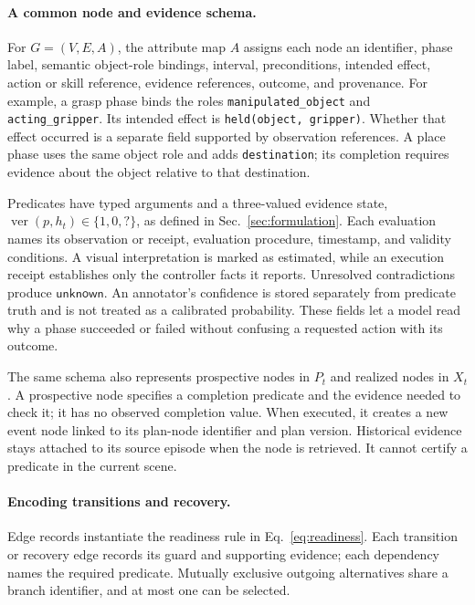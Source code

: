\paragraph{A common node and evidence schema.}
For $G=(V,E,A)$, the attribute map $A$ assigns each node an identifier, phase label, semantic object-role bindings, interval, preconditions, intended effect, action or skill reference, evidence references, outcome, and provenance. For example, a grasp phase binds the roles \texttt{manipulated\_object} and \texttt{acting\_gripper}. Its intended effect is \texttt{held(object, gripper)}. Whether that effect occurred is a separate field supported by observation references. A place phase uses the same object role and adds \texttt{destination}; its completion requires evidence about the object relative to that destination.

Predicates have typed arguments and a three-valued evidence state, $\operatorname{ver}(p,h_t)\in\{1,0,?\}$, as defined in Sec.~\ref{sec:formulation}.
Each evaluation names its observation or receipt, evaluation procedure, timestamp, and validity conditions. A visual interpretation is marked as estimated, while an execution receipt establishes only the controller facts it reports. Unresolved contradictions produce \(\mathsf{unknown}\). An annotator's confidence is stored separately from predicate truth and is not treated as a calibrated probability. These fields let a model read why a phase succeeded or failed without confusing a requested action with its outcome.

The same schema also represents prospective nodes in $P_t$ and realized nodes in $X_t$. A prospective node specifies a completion predicate and the evidence needed to check it; it has no observed completion value. When executed, it creates a new event node linked to its plan-node identifier and plan version. Historical evidence stays attached to its source episode when the node is retrieved. It cannot certify a predicate in the current scene.

\paragraph{Encoding transitions and recovery.}
Edge records instantiate the readiness rule in Eq.~\ref{eq:readiness}. Each transition or recovery edge records its guard and supporting evidence; each dependency names the required predicate. Mutually exclusive outgoing alternatives share a branch identifier, and at most one can be selected.

